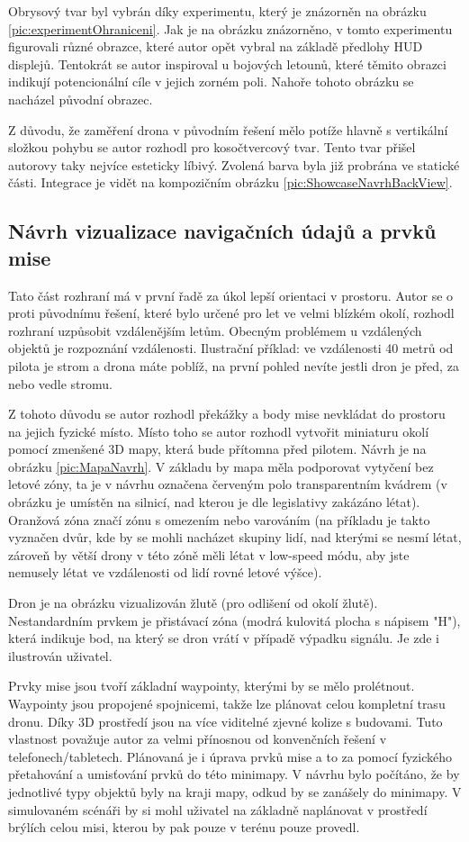 Obrysový tvar byl vybrán díky experimentu, který je znázorněn na obrázku \ref{pic:experimentOhraniceni}. Jak je na obrázku znázorněno, v tomto experimentu figurovali různé obrazce, které autor opět vybral na základě předlohy HUD displejů.  Tentokrát se autor inspiroval u bojových letounů, které těmito obrazci indikují potencionální cíle v jejich zorném poli.  Nahoře tohoto obrázku se nacházel původní obrazec. 

Z důvodu, že zaměření drona v původním řešení mělo potíže hlavně s vertikální složkou pohybu se autor rozhodl pro kosočtvercový tvar. Tento tvar přišel autorovy taky nejvíce esteticky líbivý. Zvolená barva byla již probrána ve statické části.  Integrace je vidět na kompozičním obrázku \ref{pic:ShowcaseNavrhBackView}.


\subsection{Návrh vizualizace navigačních údajů a prvků mise}
Tato část rozhraní má v první řadě za úkol lepší orientaci v prostoru. Autor se o proti původnímu řešení, které bylo určené pro let ve velmi blízkém okolí, rozhodl rozhraní uzpůsobit vzdálenějším letům. Obecným problémem u vzdálených objektů je rozpoznání vzdálenosti. Ilustrační příklad: ve vzdálenosti 40 metrů od pilota je strom a drona máte poblíž, na první pohled nevíte jestli dron je před, za nebo vedle stromu. 

Z tohoto důvodu se autor rozhodl překážky a body mise nevkládat do prostoru na jejich fyzické místo. Místo toho se autor rozhodl vytvořit miniaturu okolí pomocí zmenšené 3D mapy, která bude přítomna před pilotem. Návrh je na obrázku  \ref{pic:MapaNavrh}. V základu by mapa měla podporovat vytyčení bez letové zóny, ta je v návrhu označena červeným polo transparentním kvádrem (v obrázku je umístěn na silnicí, nad kterou je dle legislativy zakázáno létat). Oranžová zóna značí zónu s omezením nebo varováním (na příkladu je takto vyznačen dvůr, kde by se mohli nacházet skupiny lidí, nad kterými se nesmí létat, zároveň by větší drony v této zóně měli létat v low-speed módu, aby jste nemusely létat ve vzdálenosti od lidí rovné letové výšce).

Dron je na obrázku vizualizován žlutě (pro odlišení od okolí žlutě). Nestandardním prvkem je přistávací zóna (modrá kulovitá plocha s nápisem "H"), která indikuje bod, na který se dron vrátí v případě výpadku signálu. Je zde i ilustrován uživatel.

Prvky mise jsou tvoří základní waypointy, kterými by se mělo prolétnout. Waypointy jsou propojené spojnicemi, takže lze plánovat celou kompletní trasu dronu. Díky 3D prostředí jsou na více viditelné zjevné kolize s budovami. Tuto vlastnost považuje autor za velmi přínosnou od konvenčních řešení v telefonech/tabletech. Plánovaná je i úprava prvků mise a to za pomocí fyzického přetahování a umisťování prvků do této minimapy. V návrhu bylo počítáno, že by jednotlivé typy objektů byly na kraji mapy, odkud by se zanášely do minimapy. V simulovaném scénáři by si mohl uživatel na základně naplánovat v prostředí brýlích celou misi, kterou by pak pouze v terénu pouze provedl.

